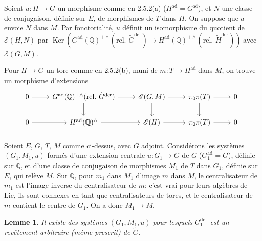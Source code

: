 \documentclass[12pt,a4paper]{article}
\theoremstyle{plain}
\newtheorem{lemma}[theorem]{Lemme}
\theoremstyle{definition}
\theoremstyle{remark}
\DeclareMathOperator{\Ker}{Ker}
\newcommand{\QQ}{\mathbb{Q}}
\begin{document}
Soient $u: H \to G$ un morphisme comme en 2.5.2(a) ($H^{\text{ad}} = G^{\text{ad}}$), et $N$ une classe de conjugaison, d\'efinie sur $E$, de morphismes de $T$ dans $H$. On suppose que $u$ envoie $N$ dans $M$. Par fonctorialit\'e, $u$ d\'efinit un isomorphisme du quotient de $\mathscr{E}(H,N)$ par $\Ker(G^{\text{ad}}(\QQ)^{+\wedge}(\text{rel.~}\tilde{G}^{\text{der}}) \to H^{\text{ad}}(\QQ)^{+\wedge}(\text{rel.~}\tilde{H}^{\text{der}}))$ avec $\mathscr{E}(G,M)$.

Pour $H \to G$ un tore comme en 2.5.2(b), muni de $m: T \to H^{\text{ad}}$ dans $M$, on trouve un morphisme d'extensions
\[
\begin{tikzcd}
0 \arrow[r] & G^{\text{ad}}(\QQ)^{+\wedge}(\text{rel.~}\tilde{G}^{\text{der}}) \arrow[r] \arrow[d] & \mathscr{E}(G,M) \arrow[r] \arrow[d] & \pi_0\pi(T) \arrow[r] \arrow[d, "="] & 0 \\
0 \arrow[r] & H^{\text{ad}}(\QQ)^{\wedge} \arrow[r] & \mathscr{E}(H) \arrow[r] & \pi_0\pi(T) \arrow[r] & 0
\end{tikzcd}
\]

\subsubsection{}

Soient $E$, $G$, $T$, $M$ comme ci-dessus, avec $G$ adjoint. Consid\'erons les syst\`emes $(G_1,M_1,u)$ form\'es d'une extension centrale $u:G_1 \to G$ de $G$ ($G_1^{\text{ad}} = G$), d\'efinie sur $\QQ$, et d'une classe de conjugaison de morphismes $M_1$ de $T$ dans $G_1$, d\'efinie sur $E$, qui rel\`eve $M$. Sur $\overline{\QQ}$, pour $m_1$ dans $M_1$ d'image $m$ dans $M$, le centralisateur de $m_1$ est l'image inverse du centralisateur de $m$: c'est vrai pour leurs alg\`ebres de Lie, ils sont connexes en tant que centralisateurs de tores, et le centralisateur de $m$ contient le centre de $G_1$. On a donc $M_1 \to M$.

\begin{lemma}
Il existe des syst\`emes $(G_1,M_1,u)$ pour lesquels $G_1^{\text{der}}$ est un rev\^etement arbitraire (m\^eme prescrit) de $\tilde{G}$.
\end{lemma}
\end{document}

